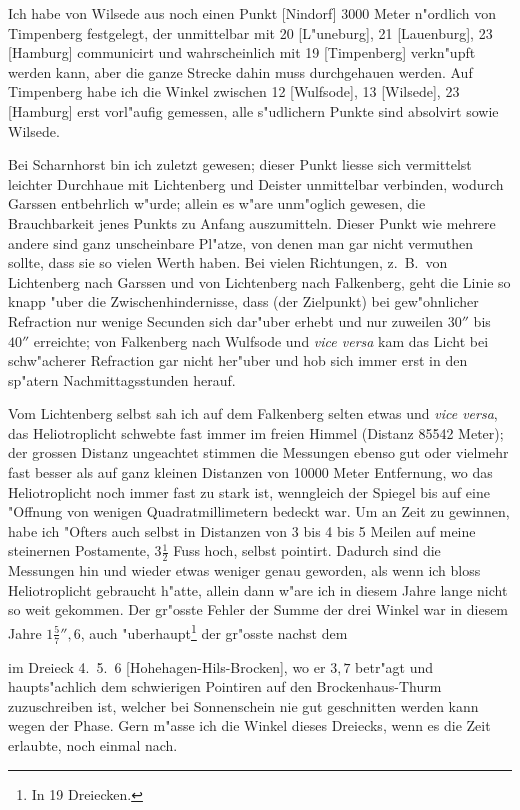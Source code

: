 \documentclass[12pt,a4paper]{article}
\theoremstyle{plain}
\theoremstyle{definition}
\theoremstyle{remark}
\begin{document}
Ich habe von Wilsede aus noch einen Punkt [Nindorf] 3000 Meter n"ordlich von Timpenberg festgelegt, der unmittelbar mit 20 [L"uneburg], 21 [Lauenburg], 23 [Hamburg] communicirt und wahrscheinlich mit 19 [Timpenberg] verkn"upft werden kann, aber die ganze Strecke dahin muss durchgehauen werden. Auf Timpenberg habe ich die Winkel zwischen 12 [Wulfsode], 13 [Wilsede], 23 [Hamburg] erst vorl"aufig gemessen, alle s"udlichern Punkte sind absolvirt sowie Wilsede.

\newpage
\noindent Bei Scharnhorst bin ich zuletzt gewesen; dieser Punkt liesse sich vermittelst leichter Durchhaue mit Lichtenberg und Deister unmittelbar verbinden, wodurch Garssen entbehrlich w"urde; allein es w"are unm"oglich gewesen, die Brauchbarkeit jenes Punkts zu Anfang auszumitteln. Dieser Punkt wie mehrere andere sind ganz unscheinbare Pl"atze, von denen man gar nicht vermuthen sollte, dass sie so vielen Werth haben. Bei vielen Richtungen, z.~B.\ von Lichtenberg nach Garssen und von Lichtenberg nach Falkenberg, geht die Linie so knapp "uber die Zwischenhindernisse, dass (der Zielpunkt) bei gew"ohnlicher Refraction nur wenige Secunden sich dar"uber erhebt und nur zuweilen $30''$ bis $40''$ erreichte; von Falkenberg nach Wulfsode und \emph{vice versa} kam das Licht bei schw"acherer Refraction gar nicht her"uber und hob sich immer erst in den sp"atern Nachmittagsstunden herauf.

Vom Lichtenberg selbst sah ich auf dem Falkenberg selten etwas und \emph{vice versa}, das Heliotroplicht schwebte fast immer im freien Himmel (Distanz 85542 Meter); der grossen Distanz ungeachtet stimmen die Messungen ebenso gut oder vielmehr fast besser als auf ganz kleinen Distanzen von 10000 Meter Entfernung, wo das Heliotroplicht noch immer fast zu stark ist, wenngleich der Spiegel bis auf eine "Offnung von wenigen Quadratmillimetern bedeckt war. Um an Zeit zu gewinnen, habe ich "Ofters auch selbst in Distanzen von 3 bis 4 bis 5 Meilen auf meine steinernen Postamente, $3\frac{1}{2}$ Fuss hoch, selbst pointirt. Dadurch sind die Messungen hin und wieder etwas weniger genau geworden, als wenn ich bloss Heliotroplicht gebraucht h"atte, allein dann w"are ich in diesem Jahre lange nicht so weit gekommen. Der gr"osste Fehler der Summe der drei Winkel war in diesem Jahre $1\frac{5}{7}''\!,\!6$, auch "uberhaupt\footnote{In 19 Dreiecken.} der gr"osste nachst dem

\newpage
\noindent im Dreieck 4.~5.~6 [Hohehagen-Hils-Brocken], wo er $3,\!7$ betr"agt und haupts"achlich dem schwierigen Pointiren auf den Brockenhaus-Thurm zuzuschreiben ist, welcher bei Sonnenschein nie gut geschnitten werden kann wegen der Phase. Gern m"asse ich die Winkel dieses Dreiecks, wenn es die Zeit erlaubte, noch einmal nach.
\end{document}
